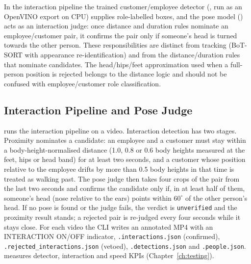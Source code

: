 In the interaction pipeline the trained customer/employee detector (, run as an OpenVINO export on CPU) supplies role-labelled boxes, and the pose model () acts as an interaction judge: once distance and duration rules nominate an employee/customer pair, it confirms the pair only if someone's head is turned towards the other person. These responsibilities are distinct from tracking (BoT-SORT with appearance re-identification) and from the distance/duration rules that nominate candidates. The head/hips/feet approximation used when a full-person position is rejected belongs to the distance logic and should not be confused with employee/customer role classification.

\subsection{Interaction Pipeline and Pose Judge}\label{sec:interaction-impl}
 runs the interaction pipeline on a video. Interaction detection has two stages. Proximity nominates a candidate: an employee and a customer must stay within a body-height-normalised distance (1.0, 0.8 or 0.6 body heights measured at the feet, hips or head band) for at least two seconds, and a customer whose position relative to the employee drifts by more than 0.5 body heights in that time is treated as walking past. The pose judge then takes four crops of the pair from the last two seconds and confirms the candidate only if, in at least half of them, someone's head (nose relative to the ears) points within $60^\circ$ of the other person's head. If no pose is found or the judge fails, the verdict is \texttt{unverified} and the proximity result stands; a rejected pair is re-judged every four seconds while it stays close. For each video the CLI writes an annotated MP4 with an INTERACTION ON/OFF indicator, \texttt{.interactions.json} (confirmed), \texttt{.rejected\_interactions.json} (vetoed), \texttt{.detections.json} and \texttt{.people.json}.  measures detector, interaction and speed KPIs (Chapter~\ref{ch:testing}).

